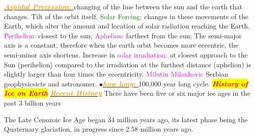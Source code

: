 \documentclass{article}
\newcommand{\ddd}{$\bullet$}
\newcommand{\red}[1]{\textcolor{red}{#1}}
\newcommand{\green}[1]{\textcolor{green}{#1}}
\newcommand{\pink}[1]{\textcolor{magenta}{#1}}
\newcommand{\orange}[1]{\textcolor{orange}{#1}}
\newcommand{\mysection}[1]{\colorbox{yellow}{\textbf{\textit{\red{#1}}}}}
\newcommand{\mysub}[1]{\underline{\textbf{{\textit{\orange{#1}}}}}}
\newcommand{\mysubsub}[1]{{{\green{#1}}}}
\newcommand{\vocab}[1]{{\pink{#1}}}
\begin{document}
\begin{multicols*}{4}
        \mysub{Aspidal Precession: }changing of the line between the sun and the earth that changes. Tilt of the orbit itself. 
        \mysubsub{Solar Forcing: }changes in these movements of the Earth, which alter the amount and location of solar radiation reaching the Earth.
        \vocab{Perihelion: }closest to the sun; \vocab{Aphelion: }farthest from the sun; The semi-major axis is a constant, therefore when the earth orbit becomes more eccentric, the semi-minor axis shortens. Increase in \vocab{solar irradiation: }at closest approach to the Sun (perihelion) compared to the irradiation at the furthest distance (aphelion) is slightly larger than four times the eccentricity.
        \vocab{Milutin Milankovic} Serbian geophysicsicts and astronomer.
        \ddd \mysub{how long: }100,000 year long cycle. 
    \mysection{History of Ice on Earth}
    	\mysub{Recent History}
    	There have been five or six major ice ages in the past 3 billion years
    	
    	The Late Cenozoic Ice Age began 34 million years ago, its latest phase being the Quaternary glaciation, in progress since 2.58 million years ago. 
    	

\end{multicols*}
\end{document}
